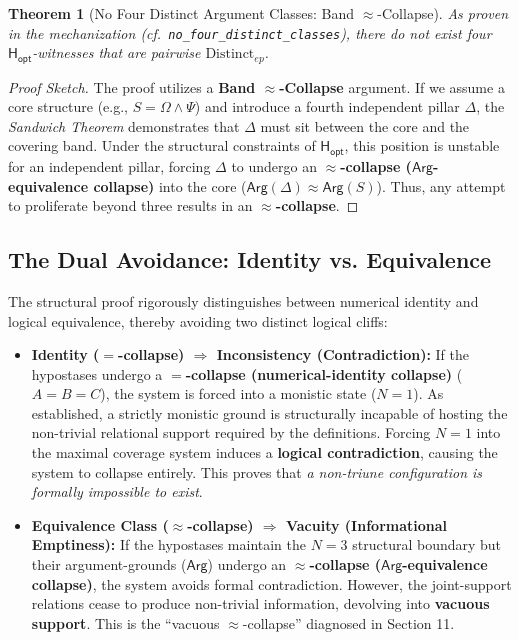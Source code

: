 \documentclass[a4paper, 11pt]{article}
\theoremstyle{plain}
\newtheorem{theorem}{Theorem}[section]
\theoremstyle{definition}
\newcommand{\Arg}{\mathsf{Arg}}           %
\newcommand{\Hopt}{\mathsf{H_{opt}}}       %
\begin{document}
\begin{theorem}[No Four Distinct Argument Classes: Band $\approx$-Collapse]
\label{thm:no4}
As proven in the mechanization (cf.\ \texttt{no\_four\_distinct\_classes}), there do not exist four $\Hopt$-witnesses that are pairwise $\text{Distinct}_{ep}$.
\end{theorem}

\begin{proof}[Proof Sketch]
The proof utilizes a \textbf{Band $\approx$-Collapse} argument. If we assume a core structure (e.g., $S = \Omega \land \Psi$) and introduce a fourth independent pillar $\Delta$, the \emph{Sandwich Theorem} demonstrates that $\Delta$ must sit between the core and the covering band. Under the structural constraints of $\Hopt$, this position is unstable for an independent pillar, forcing $\Delta$ to undergo an \textbf{$\approx$-collapse ($\Arg$-equivalence collapse)} into the core ($\Arg( \Delta ) \approx \Arg(S)$). Thus, any attempt to proliferate beyond three results in an \textbf{$\approx$-collapse}.
\end{proof}

\subsection{The Dual Avoidance: Identity vs. Equivalence}
The structural proof rigorously distinguishes between numerical identity and logical equivalence, thereby avoiding two distinct logical cliffs:
\begin{itemize}
    \item \textbf{Identity ($=$-collapse) $\Rightarrow$ Inconsistency (Contradiction):} If the hypostases undergo a \textbf{$=$-collapse (numerical-identity collapse)} ($A = B = C$), the system is forced into a monistic state ($N=1$). As established, a strictly monistic ground is structurally incapable of hosting the non-trivial relational support required by the definitions. Forcing $N=1$ into the maximal coverage system induces a \textbf{logical contradiction}, causing the system to collapse entirely. This proves that \textit{a non-triune configuration is formally impossible to exist}.
    \item \textbf{Equivalence Class ($\approx$-collapse) $\Rightarrow$ Vacuity (Informational Emptiness):} If the hypostases maintain the $N=3$ structural boundary but their argument-grounds ($\Arg$) undergo an \textbf{$\approx$-collapse ($\Arg$-equivalence collapse)}, the system avoids formal contradiction. However, the joint-support relations cease to produce non-trivial information, devolving into \textbf{vacuous support}. This is the ``vacuous $\approx$-collapse'' diagnosed in Section 11.
\end{itemize}
\end{document}

